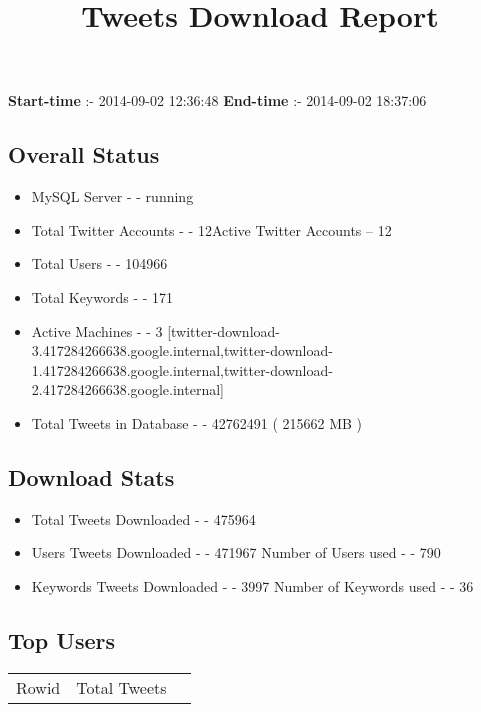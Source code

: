\documentclass{article}\usepackage[T1]{fontenc}
\begin{document}
\title{\textbf{Tweets Download Report}}
               \date{}
                \maketitle
               \centerline{\textbf{Start-time} :- 2014-09-02 12:36:48 \hspace{40pt} \textbf{End-time} :- 2014-09-02 18:37:06}               \subsection*{Overall Status}                \begin{itemize}                \item MySQL Server - - running               \item Total Twitter Accounts - - 12\newline Active Twitter Accounts -- 12               \item Total Users - - 104966               \item Total Keywords - - 171               \item Active Machines - - 3 [twitter-download-3.417284266638.google.internal,twitter-download-1.417284266638.google.internal,twitter-download-2.417284266638.google.internal]               \item Total Tweets in Database - - 42762491 ( 215662 MB )               \end{itemize}               \subsection*{Download Stats}                \begin{itemize}                \item Total Tweets Downloaded - - 475964               \item Users Tweets Downloaded - - 471967 \newline Number of Users used - - 790               \item Keywords Tweets Downloaded - - 3997 \newline Number of Keywords used - - 36              \end{itemize}              \subsection*{Top Users}\begin{tabular}{|c|c|c|}         \hline         Rowid & Total Tweets \\ 

\end{tabular}
\end{document}
